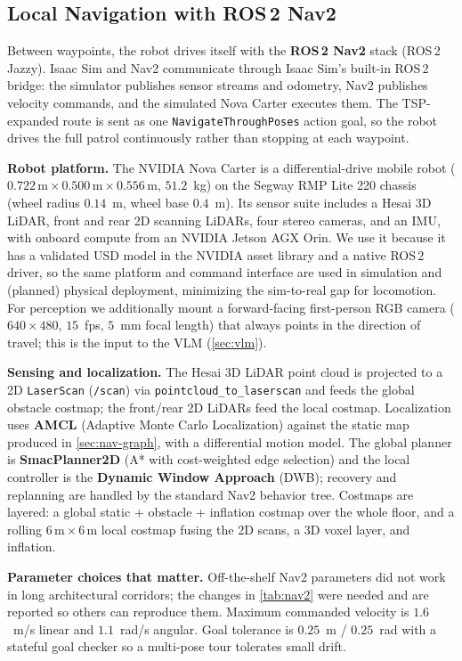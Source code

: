 \documentclass[10pt,twocolumn,letterpaper]{article}
\begin{document}
\subsection{Local Navigation with ROS\,2 Nav2}
\label{sec:nav2}

Between waypoints, the robot drives itself with the \textbf{ROS\,2 Nav2} stack
(ROS\,2 Jazzy). Isaac Sim and Nav2 communicate through Isaac Sim's built-in
ROS\,2 bridge: the simulator publishes sensor streams and odometry, Nav2 publishes
velocity commands, and the simulated Nova Carter executes them. The TSP-expanded
route is sent as one \texttt{NavigateThroughPoses} action goal, so the robot
drives the full patrol continuously rather than stopping at each waypoint.

\noindent\textbf{Robot platform.}
The NVIDIA Nova Carter is a differential-drive mobile robot
($0.722\,\text{m}\times0.500\,\text{m}\times0.556\,\text{m}$, $51.2$~kg) on the
Segway RMP Lite 220 chassis (wheel radius $0.14$~m, wheel base $0.4$~m). Its
sensor suite includes a Hesai 3D LiDAR, front and rear 2D scanning LiDARs, four
stereo cameras, and an IMU, with onboard compute from an NVIDIA Jetson AGX Orin.
We use it because it has a validated USD model in the NVIDIA asset library and a
native ROS\,2 driver, so the same platform and command interface are used in
simulation and (planned) physical deployment, minimizing the sim-to-real gap for
locomotion. For perception we additionally mount a forward-facing first-person RGB
camera ($640\times480$, $15$~fps, $5$~mm focal length) that always points in the
direction of travel; this is the input to the VLM (\cref{sec:vlm}).

\noindent\textbf{Sensing and localization.}
The Hesai 3D LiDAR point cloud is projected to a 2D \texttt{LaserScan}
(\texttt{/scan}) via \texttt{pointcloud\_to\_laserscan} and feeds the global
obstacle costmap; the front/rear 2D LiDARs feed the local costmap. Localization
uses \textbf{AMCL} (Adaptive Monte Carlo Localization) against the static map
produced in \cref{sec:nav-graph}, with a differential motion model. The global
planner is \textbf{SmacPlanner2D} (A* with cost-weighted edge selection) and the
local controller is the \textbf{Dynamic Window Approach} (DWB); recovery and
replanning are handled by the standard Nav2 behavior tree. Costmaps are layered: a
global static + obstacle + inflation costmap over the whole floor, and a rolling
$6\,\text{m}\times6\,\text{m}$ local costmap fusing the 2D scans, a 3D voxel
layer, and inflation.

\noindent\textbf{Parameter choices that matter.}
Off-the-shelf Nav2 parameters did not work in long architectural corridors; the
changes in \cref{tab:nav2} were needed and are reported so others can reproduce
them. Maximum commanded velocity is $1.6$~m/s linear and $1.1$~rad/s angular.
Goal tolerance is $0.25$~m / $0.25$~rad with a stateful goal checker so a
multi-pose tour tolerates small drift.
\end{document}

